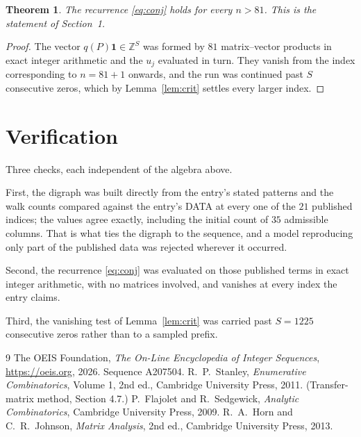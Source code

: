 \documentclass[11pt,a4paper]{article}
\theoremstyle{plain}
\newtheorem{theorem}{Theorem}
\theoremstyle{definition}
\begin{document}
\begin{theorem}
The recurrence \eqref{eq:conj} holds for every $n>81$. This is the statement of
Section~1.
\end{theorem}

\begin{proof}
The vector $q(P)\mathbf{1}\in\mathbb{Z}^{S}$ was formed by $81$ matrix--vector
products in exact integer arithmetic and the $u_j$ evaluated in turn. They vanish from the
index corresponding to $n=81+1$ onwards, and the run was continued past $S$ consecutive
zeros, which by Lemma~\ref{lem:crit} settles every larger index.
\end{proof}

\section{Verification}

Three checks, each independent of the algebra above.

First, the digraph was built directly from the entry's stated patterns and the walk counts
compared against the entry's DATA at every one of the $21$ published indices; the
values agree exactly, including the initial count of $35$ admissible columns. That is
what ties the digraph to the sequence, and a model reproducing only part of the published
data was rejected wherever it occurred.

Second, the recurrence \eqref{eq:conj} was evaluated on those published terms in exact
integer arithmetic, with no matrices involved, and vanishes at every index the entry claims.

Third, the vanishing test of Lemma~\ref{lem:crit} was carried past $S=1225$ consecutive
zeros rather than to a sampled prefix.

\begin{thebibliography}{9}
 The OEIS Foundation, \emph{The On-Line Encyclopedia of Integer
Sequences}, \url{https://oeis.org}, 2026. Sequence A207504.
 R.~P.~Stanley, \emph{Enumerative Combinatorics}, Volume 1, 2nd ed.,
Cambridge University Press, 2011. (Transfer-matrix method, Section 4.7.)
 P.~Flajolet and R.~Sedgewick, \emph{Analytic Combinatorics}, Cambridge
University Press, 2009.
 R.~A.~Horn and C.~R.~Johnson, \emph{Matrix Analysis}, 2nd ed., Cambridge
University Press, 2013.
\end{thebibliography}
\end{document}
